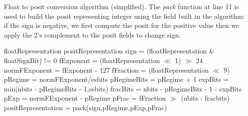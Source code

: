 \begin{algorithm}
 \caption{Float to posit conversion algorithm (simplified). The \textit{pack} function at line 11 is used to build the posit representing integer using the field built in the algorithm: if the sign is negative, we first compute the posit for the positive value then we apply the 2's complement to the posit fields to change sign.}
 \label{alg:positenc}
 \begin{algorithmic}[1]
 \renewcommand{\algorithmicrequire}{\textbf{Input:}}
 \renewcommand{\algorithmicensure}{\textbf{Output:}}
 \Require floatRepresentation
 \Ensure positRepresentation
\State sign = (floatRepresentation \& floatSignBit) != 0
\State fExponent = (floatRepresentation $\ll$ 1) $\gg$ 24
\State normFExponent = fExponent - 127
\State fFraction = (floatRepresentation $\ll$ 9) 
\State pRegime = normFExponent/esbits
\State pRegimeBits = pRegime + 1
\State expBits = min(nbits - pRegimeBits - 1,esbits)
\State fracBits = nbits - pRegimeBits - 1 - expBits
\State pExp = normFExponent - pRegime 
\State pFrac = fFraction $\gg$ (nbits - fracbits)
\State positRepresentation = pack(sign,pRegime,pExp,pFrac)
\end{algorithmic} 
\end{algorithm}

